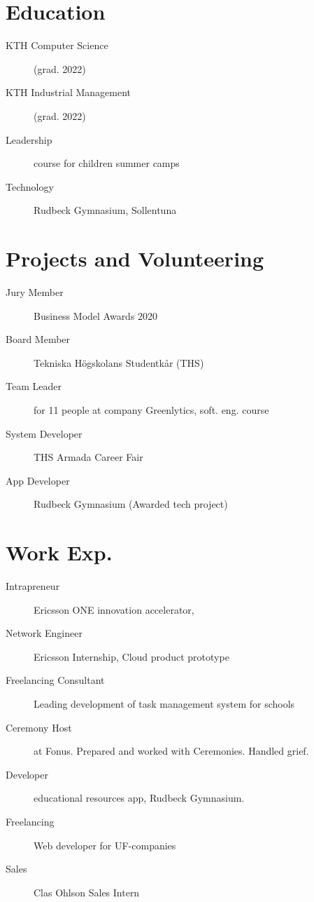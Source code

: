 \documentclass[margin,line,a4paper]{resume}
\begin{document}
\begin{resume}
\section{\mysidestyle Education}\vspace{1mm}
    \begin{description}
        \item[KTH Computer Science] (grad. 2022)
        \item[KTH Industrial Management] (grad. 2022)
         \item[Leadership] course for children summer camps
        \item[Technology] Rudbeck Gymnasium, Sollentuna
    \end{description} 

\section{\mysidestyle Projects and Volunteering}\vspace{1mm}
\begin{description}
    \item[Jury Member] Business Model Awards 2020 
    \item[Board Member] Tekniska Högskolans Studentkår (THS) 
    \item[Team Leader] for 11 people at company Greenlytics, soft. eng. course  
     \item[System Developer] THS Armada Career Fair
    \item[App Developer] Rudbeck Gymnasium (Awarded tech project) 

\end{description}  
  
\section{\mysidestyle Work Exp.}\vspace{1mm}
\begin{description}
    \item[Intrapreneur] Ericsson ONE innovation accelerator, 
    \item[Network Engineer] Ericsson Internship, Cloud product prototype
    \item[Freelancing Consultant] Leading development of task management system for schools
    \item[Ceremony Host] at Fonus. Prepared and worked with Ceremonies. Handled grief.
    \item[Developer] educational resources app, Rudbeck Gymnasium.
    \item[Freelancing] Web developer for UF-companies
    \item[Sales] Clas Ohlson Sales Intern
\end{description}


\end{resume}
\end{document}
